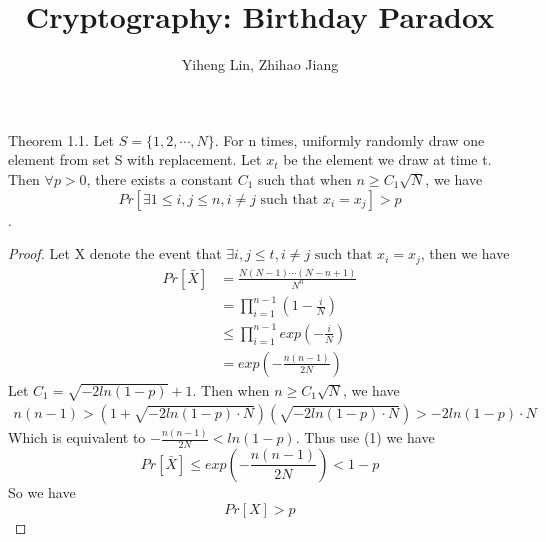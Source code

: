 \documentclass{article}
\title{\textmd{\bf Cryptography: Birthday Paradox}}
\date{}
\author{Yiheng Lin, Zhihao Jiang}
\begin{document}
    \begin{spacing}{1.1}
    \maketitle %


    \section{}
    \subsection{}
    Theorem 1.1. Let $S = \{1, 2, \cdots, N\}$. For n times, uniformly randomly draw one element from set S with replacement. Let $x_t$ be the element we draw at time t. Then $\forall p > 0$, there exists a constant $C_1$ such that when $n \geq C_1 \sqrt{N}$, we have
    $$Pr[\exists 1\leq i, j \leq n, i\not = j \text{ such that } x_i = x_j] > p$$.
    \begin{proof}
        Let X denote the event that $\exists i, j \leq t, i\not = j \text{ such that } x_i = x_j$, then we have
        \begin{equation}
            \begin{aligned}
                Pr[\bar{X}] &= \frac{N(N-1)\cdots (N-n+1)}{N^n}\\
                &= \prod_{i=1}^{n-1}(1 - \frac{i}{N})\\
                &\leq \prod_{i=1}^{n-1} exp(-\frac{i}{N})\\
                &= exp(-\frac{n(n-1)}{2N})
            \end{aligned}
        \end{equation}
        Let $C_1 = \sqrt{-2ln(1 - p)} + 1$. Then when $n \geq C_1\sqrt{N}$, we have
        \begin{equation}
            \begin{aligned}
                n(n-1) > (1 + \sqrt{-2ln(1 - p)\cdot N})(\sqrt{-2ln(1 - p)\cdot N}) > -2ln(1-p)\cdot N
            \end{aligned}
        \end{equation}
        Which is equivalent to $-\frac{n(n-1)}{2N} < ln(1 - p)$.
        Thus use (1) we have
        $$Pr[\bar{X}] \leq exp(-\frac{n(n-1)}{2N}) < 1 - p$$
        So we have
        $$Pr[X] > p$$
    \end{proof}

\end{spacing}
\end{document}
